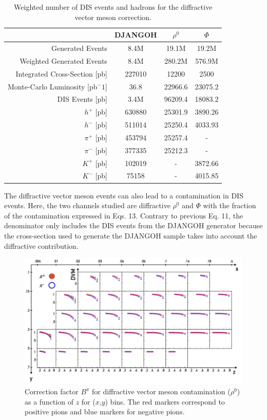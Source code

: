 \begin{table}
	\centering
	\begin{tabular}{rccc}
    \hline
     & DJANGOH & $\rho^0$ & $\Phi$ \\
    \hline
    Generated Events & 8.4M & 19.1M & 19.2M  \\
    Weighted Generated Events & 8.4M & 280.2M & 576.9M  \\
		Integrated Cross-Section [pb] & 227010 & 12200 & 2500  \\
		Monte-Carlo Luminosity [pb$^-1$] & 36.8 & 22966.6 & 23075.2  \\
    \hline
		DIS Events [pb] & 3.4M & 96209.4 & 18083.2  \\
		$h^+$ [pb] & 630880 & 25301.9 & 3890.26  \\
		$h^-$ [pb] & 511014 & 25250.4 & 4033.93  \\
		$\pi^+$ [pb] & 453794 & 25257.4 & -  \\
		$\pi^-$ [pb] & 377335 & 25212.3 & -  \\
		$K^+$ [pb] & 102019 & - & 3872.66  \\
		$K^-$ [pb] & 75158 & - & 4015.85 \\
  \end{tabular}
  \caption{Weighted number of DIS events and hadrons for the diffractive vector meson correction.}
  \label{DVM}
\end{table}

The diffractive vector meson events can also lead to a contamination in DIS events. Here, the two channels studied are diffractive $\rho^0$ and $\Phi$ with the fraction of the contamination expressed in Eqs. 13. Contrary to previous Eq. 11, the denominator only includes the DIS events from the DJANGOH generator because the cross-section used to generate the DJANGOH sample takes into account the diffractive contribution.

\begin{figure}
  \centering
	\includegraphics[scale=0.5]{./gfx/DVMpi.png}
	\caption{Correction factor $B^{\pi}$ for diffractive vector meson contamination ($\rho^0$) as a function of $z$ for ($x$,$y$) bins. The red markers correspond to positive pions and blue markers for negative pions.}
	\label{DVMpi}
\end{figure}

